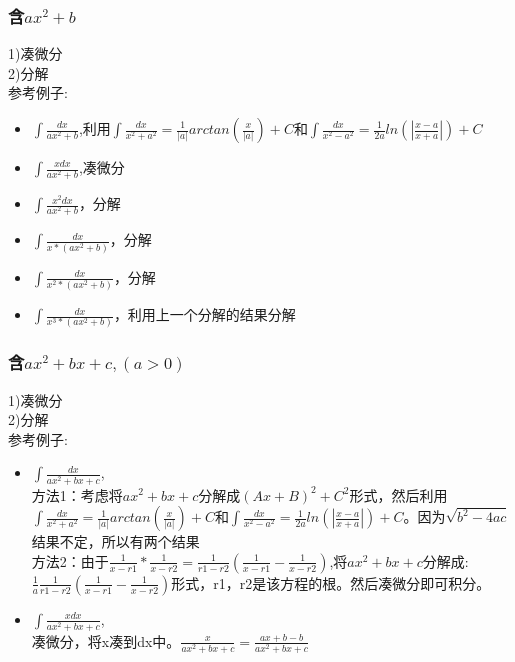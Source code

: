 \documentclass[fleqn]{article}
\begin{document}
\begin{flushleft}
		\subsubsection{含$ax^2+b$}
		1)凑微分\\
		2)分解\\
		参考例子:\\
		\begin{itemize}
			\item	$\int \frac{dx}{ax^2+b}$,利用$\int\frac{dx}{x^2+a^2}=\frac{1}{|a|}arctan(\frac{x}{|a|})+C $和$\int\frac{dx}{x^2-a^2}=\frac{1}{2a}ln(|\frac{x-a}{x+a}|)+C $\\
			\item	$\int \frac{xdx}{ax^2+b}$,凑微分\\
			\item	$\int \frac{x^2dx}{ax^2+b}$，分解\\
			\item	$\int \frac{dx}{x*(ax^2+b)}$，分解\\
			\item	$\int \frac{dx}{x^2*(ax^2+b)}$，分解\\
			\item	$\int \frac{dx}{x^3*(ax^2+b)}$，利用上一个分解的结果分解\\
		\end{itemize}
		\subsubsection{含$ax^2+bx+c,(a>0)$}
		1)凑微分\\
		2)分解\\
		参考例子:\\
		\begin{itemize}
			\item $\int \frac{dx}{ax^2+bx+c}$,\\
			方法1：考虑将$ax^2+bx+c$分解成$(Ax+B)^2+C^2$形式，然后利用$\int\frac{dx}{x^2+a^2}=\frac{1}{|a|}arctan(\frac{x}{|a|})+C $和$\int\frac{dx}{x^2-a^2}=\frac{1}{2a}ln(|\frac{x-a}{x+a}|)+C $。因为$\sqrt{b^2-4ac}$结果不定，所以有两个结果\\
			方法2：由于$\frac{1}{x-r1}*\frac{1}{x-r2}=\frac{1}{r1-r2}(\frac{1}{x-r1}-\frac{1}{x-r2})$,将$ax^2+bx+c$分解成:$\frac{1}{a}\frac{1}{r1-r2}(\frac{1}{x-r1}-\frac{1}{x-r2})$形式，r1，r2是该方程的根。然后凑微分即可积分。
			\item $\int \frac{xdx}{ax^2+bx+c}$,\\
				凑微分，将x凑到dx中。$\frac{x}{ax^2+bx+c}=\frac{ax+b-b}{ax^2+bx+c}$
		\end{itemize}

\end{flushleft}
\end{document}
